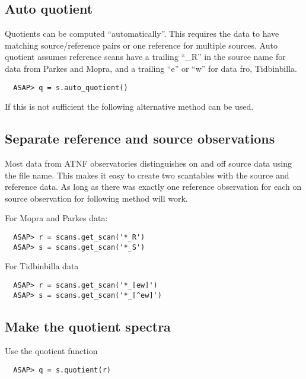 \documentclass[11pt]{article}
\begin{document}

\subsection{Auto quotient}
Quotients can be computed ``automatically''. This
requires the data to have matching source/reference pairs or one
reference for multiple sources. Auto quotient assumes reference scans
have a trailing ``\_R'' in the source name for data from Parkes and
Mopra, and a trailing ``e'' or ``w'' for data fro, Tidbinbilla.

\begin{verbatim}
  ASAP> q = s.auto_quotient()
\end{verbatim}

If this is not sufficient the following alternative method can be used.

\subsection{Separate reference and source observations}

Most data from ATNF observatories
distinguishes on and off source data using the file name. This makes
it easy to create two scantables with the source and reference
data. As long as there was exactly one reference observation for each
on source observation for following method will work.

For Mopra and Parkes data:
\begin{verbatim}
  ASAP> r = scans.get_scan('*_R')
  ASAP> s = scans.get_scan('*_S')
\end{verbatim}

For Tidbinbilla data
\begin{verbatim}
  ASAP> r = scans.get_scan('*_[ew]')
  ASAP> s = scans.get_scan('*_[^ew]')
\end{verbatim}

\subsection{Make the quotient spectra}

Use the quotient function

\begin{verbatim}
  ASAP> q = s.quotient(r)
\end{verbatim}
\end{document}
